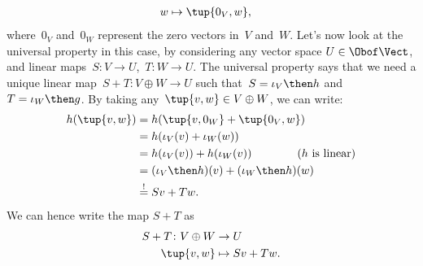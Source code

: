 {\begin{example}
\begin{equation*}
\begin{aligned}
                w                & \mapsto \tup{0_V,w},
            \end{aligned}
        \end{equation*}
        where~$0_V$ and~$0_W$ represent the zero vectors in~$V$ and~$W$.
        Let's now look at the universal property in this case, by considering any vector space $U\in \Obof\Vect$, and linear maps~$S\colon V\to U$,~$T\colon W\to U$.
        The universal property says that we need a unique linear map~$S+T\colon V\oplus W \to U$ such that~$S=\iota_V\then h$ and~$T=\iota_W\then g$.
        By taking any~$\tup{v,w}\in V\oplus W$, we can write:
        \begin{equation*}
            \begin{aligned}
                h(\tup{v,w}) & =h(\tup{v,0_W}+\tup{0_V,w})                                      \\
                             & =h(\iota_V(v)+\iota_W(w))                                        \\
                             & =h(\iota_V(v))+h(\iota_W(v)) \qquad \qquad (h \text{ is linear}) \\
                             & =(\iota_V\then h)(v)+(\iota_W\then h)(w)                         \\
                             & \overset{!
                }{=}
                Sv+Tw.
            \end{aligned}
        \end{equation*}
        We can hence write the map $S+T$ as
        \begin{equation*}
            \begin{aligned}
                S+T\colon V\oplus W & \to U          \\
                \tup{v,w}           & \mapsto Sv+Tw.
            \end{aligned}
        \end{equation*}
    \end{example}
}
